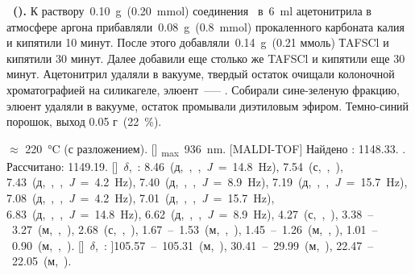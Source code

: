 \textbf{~().}  
К раствору~\SI{0.10}{\gram}~(\SI{0.20}{\mmol}) соединения~ в~\SI{6}{\milli\litre} ацетонитрила в атмосфере аргона прибавляли~\SI{0.08}{\gram}~(\SI{0.8}{\mmol}) прокаленного карбоната калия и кипятили 10 минут. 
После этого добавляли~\SI{0.14}{\gram}~(0.21 ммоль) ТAFSCl и кипятили 30 минут. 
Далее добавили еще столько же TAFSCl и кипятили еще 30 минут. Ацетонитрил удаляли в вакууме, твердый остаток очищали колоночной хроматографией на силикагеле, элюент~—-- . 
Собирали сине-зеленую фракцию, элюент удаляли в вакууме, остаток промывали диэтиловым эфиром. 
Темно-синий порошок, выход 0.05 г~(\SI{22}{\percent}).
\begin{experimental}
     $\approx$ \SI{220}{\celsius} (с разложением).
    [] \chemlambda\textsubscript{max}~\SI{936}{\nano\metre}.
    [MALDI-TOF] Найдено \ce{[M+ - H]}: \num{1148.33}. . Рассчитано:  \num{1149.19}.
    []~$\delta$,~\si{\ppm}: 8.46~(д,~,~,~\textit{J}~=~14.8~\si{\hertz}), 7.54~(с,~,~), 7.43~(д,~,~,~\textit{J}~=~4.2~\si{\hertz}), 7.40~(д,~,~,~\textit{J}~=~8.9~\si{\hertz}), 7.19~(д,~,~,~\textit{J}~=~15.7~\si{\hertz}), 7.08~(д,~,~,~\textit{J}~=~4.2~\si{\hertz}), 7.01~(д,~,~,~\textit{J}~=~15.7~\si{\hertz}), 6.83~(д,~,~,~\textit{J}~=~14.8~\si{\hertz}), 6.62~(д,~,~,~\textit{J}~=~8.9~\si{\hertz}), 4.27~(с,~,~), 3.38~--~3.27~(м,~,~), 2.68~(с,~,~), 1.67~--~1.53~(м,~,~), 1.45~--~1.26~(м,~, ), 1.01~--~0.90~(м,~,~).
    []~$\delta$,~\si{\ppm}: ]105.57~--~105.31~(м,~), 30.41~--~29.99~(м,~), 22.47~--~22.05~(м,~).
\end{experimental}

